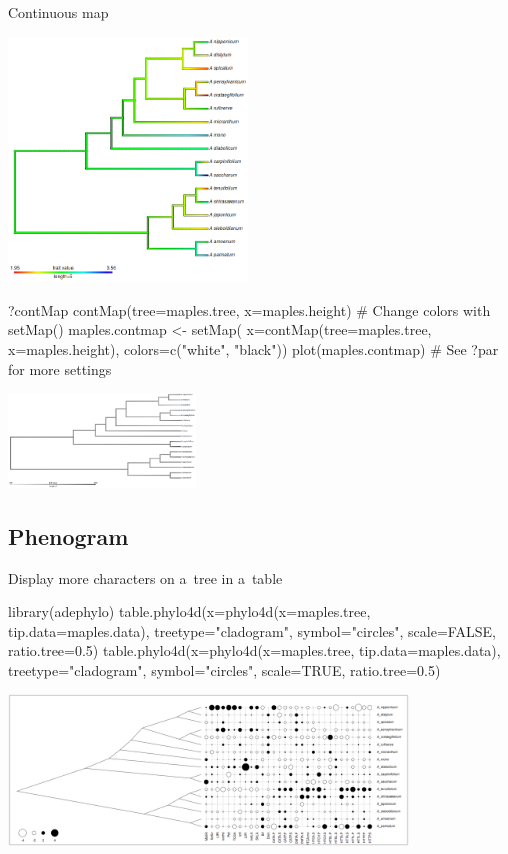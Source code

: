 \documentclass[compress, ucs, xelatex, 11pt, xcolor=svgnames, aspectratio=169,
	hyperref={
		bookmarks=true,
		unicode=true,
		colorlinks=true,
		pdftitle={Molecular data in R},
		plainpages=false,
		pdfauthor={Vojtech Zeisek},
		pdfsubject={Course about phylogeny and evolution in R},
		pdfcreator={XeLaTeX},
		pdfkeywords={R, evolution, phylogeny, molecular data},
		linkcolor=Crimson, %
		anchorcolor=Magenta, %
		citecolor=Magenta, %
		filecolor=Magenta, %
		menucolor=Magenta, %
		urlcolor=DodgerBlue, %
		pdftex},
	url={hyphens, lowtilde} %
	]{beamer}
\begin{document}
\begin{frame}[fragile]{Continuous map}
	\begin{multicols}{2}
		\begin{center}
			\includegraphics[height=6.5cm]{contmap.png}
		\end{center}
		\begin{spluscode}
    ?contMap
    contMap(tree=maples.tree,
      x=maples.height)
    # Change colors with setMap()
    maples.contmap <- setMap(
      x=contMap(tree=maples.tree,
      x=maples.height),
      colors=c("white", "black"))
    plot(maples.contmap)
    # See ?par for more settings
		\end{spluscode}
		\begin{center}
			\includegraphics[height=2.5cm]{contmapbw.png}
		\end{center}
		\vfill
	\end{multicols}
\end{frame}

\subsection{Phenogram}

\begin{frame}[fragile]{Display more characters on a~tree in a~table}
	\begin{spluscode}
    library(adephylo)
    table.phylo4d(x=phylo4d(x=maples.tree, tip.data=maples.data),
      treetype="cladogram", symbol="circles", scale=FALSE, ratio.tree=0.5)
    table.phylo4d(x=phylo4d(x=maples.tree, tip.data=maples.data),
      treetype="cladogram", symbol="circles", scale=TRUE, ratio.tree=0.5)
	\end{spluscode}
	\begin{center}
		\includegraphics[height=4cm]{phylotable.png}
	\end{center}
\end{frame}
\end{document}
